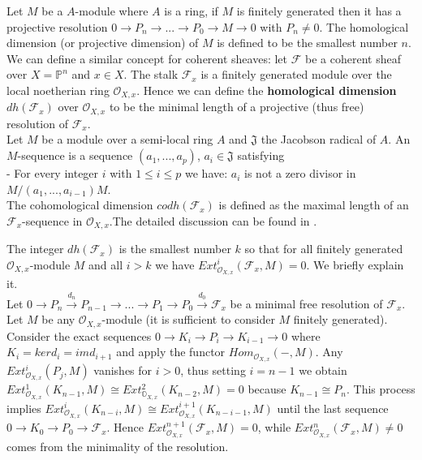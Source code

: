 \documentclass[
	oldfontcommands,
	sumario=abnt-6027-2012,
	12pt,			%
	openright,		%
	oneside,		%
	a4paper,		%
	english,		%
	brazil			%
	]{imecc-unicamp}
\begin{document}
\begin{definition}\label{homologicaldimension}
Let $M$ be a $A$-module where $A$ is a ring, if $M$ is finitely generated then it has a projective resolution $0 \to P_n \to ... \to P_0 \to M \to 0$ with $P_n \not= 0$. The homological dimension (or projective dimension) of $M$ is defined to be the smallest number $n$. We can define a similar concept for coherent sheaves:
let $\mathcal{F}$ be a coherent sheaf over $X=\mathbb{P}^n$ and $x \in X$. The stalk $\mathcal{F}_x$ is a finitely generated module over the local noetherian ring $\mathcal{O}_{X,x}$. Hence we can define the \textbf{homological dimension} $dh(\mathcal{F}_x)$ over $\mathcal{O}_{X,x}$ to be the minimal length of a projective (thus free) resolution of $\mathcal{F}_x$. \\
Let $M$ be a module over a semi-local ring $A$ and $\mathfrak{J}$ the Jacobson radical of $A$. An $M$-sequence is a sequence $(a_1,...,a_p)$, $a_i \in \mathfrak{J}$ satisfying\\
- For every integer $i$ with $1 \leq i \leq p$ we have: $a_i$ is not a zero divisor in $M/(a_1,...,a_{i-1})M$.\\
The cohomological dimension $codh(\mathcal{F}_x)$ is defined as the maximal length of an $\mathcal{F}_x$-sequence in $\mathcal{O}_{X,x}$.The detailed discussion can be found in \cite[Serre, IV-14]{serre_1975}.
\end{definition}
The integer $dh(\mathcal{F}_x)$ is the smallest number $k$ so that for all finitely generated $\mathcal{O}_{X,x}$-module $M$ and all $i>k$ we have $Ext^i_{\mathcal{O}_{X,x}}(\mathcal{F}_x,M)=0$. We briefly explain it. \\
Let $0 \to P_n \overset{d_n}{\to} P_{n-1} \to ... \to P_1 \to P_0 \overset{d_0}{\to} \mathcal{F}_x$ be a minimal free resolution of $\mathcal{F}_x$. Let $M$ be any $\mathcal{O}_{X,x}$-module (it is sufficient to consider $M$ finitely generated). Consider the exact sequences $0 \to K_i \to P_i \to K_{i-1} \to 0$ where $K_i = ker d_i=im d_{i+1}$ and apply the functor $Hom_{\mathcal{O}_{X,x}}(-,M)$. Any $Ext_{\mathcal{O}_{X,x}}^i(P_j,M)$ vanishes for $i>0$, thus setting $i=n-1$ we obtain $Ext_{\mathcal{O}_{X,x}}^1(K_{n-1},M) \cong Ext_{\mathbb{O}_{X,x}}^2(K_{n-2},M)=0$ because $K_{n-1} \cong P_n$. This process implies $Ext_{\mathcal{O}_{X,x}}^i(K_{n-i},M)\cong Ext_{\mathcal{O}_{X,x}}^{i+1}(K_{n-i-1},M)$ until the last sequence $0 \to K_0 \to P_0 \to \mathcal{F}_x$. Hence $Ext_{\mathcal{O}_{X,x}}^{n+1}(\mathcal{F}_x,M)=0$, while $Ext_{\mathcal{O}_{X,x}}^n(\mathcal{F}_x,M) \not = 0$ comes from the minimality of the resolution.
\end{document}
